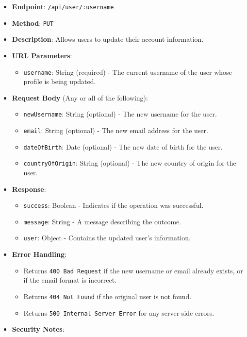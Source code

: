 \begin{itemize}
\tightlist
\item
  \textbf{Endpoint}: \texttt{/api/user/:username}
\item
  \textbf{Method}: \texttt{PUT}
\item
  \textbf{Description}: Allows users to update their account
  information.
\item
  \textbf{URL Parameters}:

  \begin{itemize}
  \tightlist
  \item
    \texttt{username}: String (required) - The current username of the
    user whose profile is being updated.
  \end{itemize}
\item
  \textbf{Request Body} (Any or all of the following):

  \begin{itemize}
  \tightlist
  \item
    \texttt{newUsername}: String (optional) - The new username for the
    user.
  \item
    \texttt{email}: String (optional) - The new email address for the
    user.
  \item
    \texttt{dateOfBirth}: Date (optional) - The new date of birth for
    the user.
  \item
    \texttt{countryOfOrigin}: String (optional) - The new country of
    origin for the user.
  \end{itemize}
\item
  \textbf{Response}:

  \begin{itemize}
  \tightlist
  \item
    \texttt{success}: Boolean - Indicates if the operation was
    successful.
  \item
    \texttt{message}: String - A message describing the outcome.
  \item
    \texttt{user}: Object - Contains the updated user's information.
  \end{itemize}
\item
  \textbf{Error Handling}:

  \begin{itemize}
  \tightlist
  \item
    Returns \texttt{400\ Bad\ Request} if the new username or email
    already exists, or if the email format is incorrect.
  \item
    Returns \texttt{404\ Not\ Found} if the original user is not found.
  \item
    Returns \texttt{500\ Internal\ Server\ Error} for any server-side
    errors.
  \end{itemize}
\item
  \textbf{Security Notes}:


\end{itemize}
